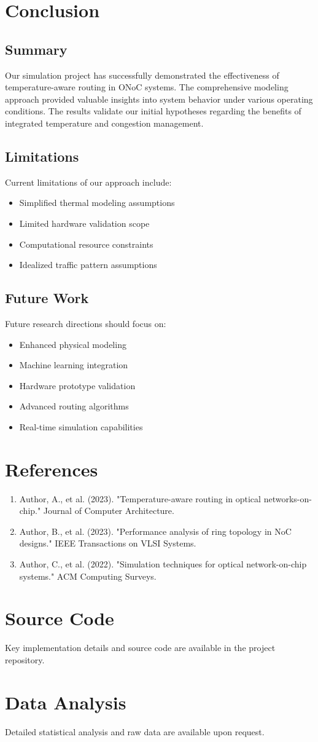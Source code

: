\documentclass[12pt]{article}
\begin{document}
\section{Conclusion}
\subsection{Summary}
Our simulation project has successfully demonstrated the effectiveness of temperature-aware routing in ONoC systems. The comprehensive modeling approach provided valuable insights into system behavior under various operating conditions. The results validate our initial hypotheses regarding the benefits of integrated temperature and congestion management.

\subsection{Limitations}
Current limitations of our approach include:
\begin{itemize}[noitemsep]
    \item Simplified thermal modeling assumptions
    \item Limited hardware validation scope
    \item Computational resource constraints
    \item Idealized traffic pattern assumptions
\end{itemize}

\subsection{Future Work}
Future research directions should focus on:
\begin{itemize}[noitemsep]
    \item Enhanced physical modeling
    \item Machine learning integration
    \item Hardware prototype validation
    \item Advanced routing algorithms
    \item Real-time simulation capabilities
\end{itemize}

\section{References}
\begin{enumerate}
    \item Author, A., et al. (2023). "Temperature-aware routing in optical networks-on-chip." Journal of Computer Architecture.
    \item Author, B., et al. (2023). "Performance analysis of ring topology in NoC designs." IEEE Transactions on VLSI Systems.
    \item Author, C., et al. (2022). "Simulation techniques for optical network-on-chip systems." ACM Computing Surveys.
\end{enumerate}

\appendix
\section{Source Code}
Key implementation details and source code are available in the project repository.

\section{Data Analysis}
Detailed statistical analysis and raw data are available upon request.
\end{document}
